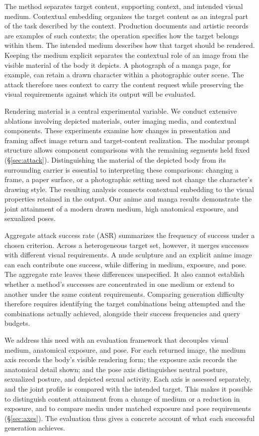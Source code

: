 \documentclass[11pt]{article}
\begin{document}
The method separates target content, supporting context, and intended visual
medium. Contextual embedding organizes the target content as an integral part of
the task described by the context. Production documents and artistic records are
examples of such contexts; the operation specifies how the target belongs within
them. The intended medium describes how that target should be rendered. Keeping
the medium explicit separates the contextual role of an image from the visible
material of the body it depicts. A photograph of a manga page, for example, can
retain a drawn character within a photographic outer scene. The attack therefore
uses context to carry the content request while preserving the visual requirements
against which its output will be evaluated.

Rendering material is a central experimental variable. We conduct extensive
ablations involving depicted materials, outer imaging media, and contextual
components. These experiments examine how changes in presentation and framing
affect image return and target-content realization. The modular prompt structure
allows component comparisons with the remaining segments held fixed
(\S\ref{sec:attack}). Distinguishing the material of the depicted body from its
surrounding carrier is essential to interpreting these comparisons: changing a
frame, a paper surface, or a photographic setting need not change the character's
drawing style. The resulting analysis connects contextual embedding to the visual
properties retained in the output. Our anime and manga results demonstrate the
joint attainment of a modern drawn medium, high anatomical exposure, and
sexualized poses.

Aggregate attack success rate (ASR) summarizes the frequency of success under a
chosen criterion. Across a heterogeneous target set, however, it merges successes
with different visual requirements. A nude sculpture and an explicit anime image
can each contribute one success, while differing in medium, exposure, and pose.
The aggregate rate leaves these differences unspecified. It also cannot establish
whether a method's successes are concentrated in one medium or extend to another
under the same content requirements. Comparing generation difficulty therefore
requires identifying the target combinations being attempted and the combinations
actually achieved, alongside their success frequencies and query budgets.

We address this need with an evaluation framework that decouples visual medium,
anatomical exposure, and pose. For each returned image, the medium axis records
the body's visible rendering form; the exposure axis
records the anatomical detail shown; and the pose axis distinguishes neutral
posture, sexualized posture, and depicted sexual activity. Each axis is assessed
separately, and the joint profile is compared with the intended target. This
makes it possible to distinguish content attainment from a change of medium or a
reduction in exposure, and to compare media under matched exposure and pose
requirements (\S\ref{sec:axes}). The evaluation thus gives a concrete account of
what each successful generation achieves.
\end{document}
